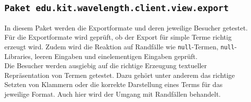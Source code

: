 \documentclass[parskip=full,11pt]{scrartcl}
\begin{document}
\subsection{\texttt{Paket edu.kit.wavelength.client.view.export}}
In diesem Paket werden die Exportformate und deren jeweilige Besucher getestet.
Für die Exportformate wird geprüft, ob der Export für simple Terme richtig erzeugt wird. Zudem wird die Reaktion auf Randfälle wie \texttt{null}-Termen, \texttt{null}-Libraries, leeren Eingaben und einelementigen Eingaben geprüft.\\
Die Besucher werden ausgiebig auf die richtige Erzeugung textueller Repräsentation von Termen getestet. Dazu gehört unter anderem das richtige Setzten von Klammern oder die korrekte Darstellung eines Terms für das jeweilige Format. Auch hier wird der Umgang mit Randfällen behandelt.
\end{document}
